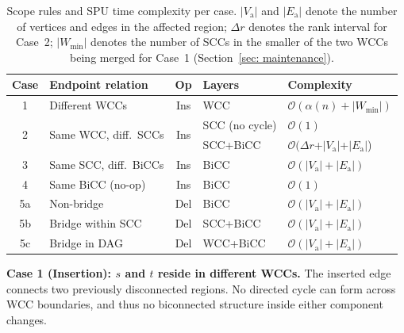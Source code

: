 \begin{table}[t]
    \centering
    \setlength{\tabcolsep}{3pt}
    \caption{Scope rules and SPU time complexity per case.
    $|V_{\mathrm{a}}|$ and $|E_{\mathrm{a}}|$ denote the number of vertices and edges in the affected region;
    $\Delta r$ denotes the rank interval for Case~2;
    $|W_{\min}|$ denotes the number of SCCs in the smaller of the two WCCs being merged for Case~1 (Section~\ref{sec: maintenance}).}
    \begin{tabular}{c l c l l}
    \toprule
    \textbf{Case} & \textbf{Endpoint relation} & \textbf{Op} & \textbf{Layers} & \textbf{Complexity} \\
    \midrule
    1  & Different WCCs                         & Ins & WCC             & $\mathcal{O}(\alpha(n) + |W_{\min}|)$ \\
    \multirow{2}{*}{2}
       & \multirow{2}{*}{Same WCC, diff.\ SCCs} & \multirow{2}{*}{Ins}
                                                & SCC (no cycle)  & $\mathcal{O}(1)$ \\
       &                                        &     & SCC+BiCC        & $\mathcal{O}(\Delta r$+$|V_{\mathrm{a}}|$+$|E_{\mathrm{a}}|$) \\
    3  & Same SCC, diff.\ BiCCs                 & Ins & BiCC            & $\mathcal{O}(|V_{\mathrm{a}}|+|E_{\mathrm{a}}|)$ \\
    4  & Same BiCC (no-op)                      & Ins & BiCC             & $\mathcal{O}(1)$ \\
    \midrule
    5a & Non-bridge                             & Del & BiCC            & $\mathcal{O}(|V_{\mathrm{a}}|+|E_{\mathrm{a}}|)$ \\
    5b & Bridge within SCC                      & Del & SCC+BiCC        & $\mathcal{O}(|V_{\mathrm{a}}|+|E_{\mathrm{a}}|)$ \\
    5c & Bridge in DAG                          & Del & WCC+BiCC        & $\mathcal{O}(|V_{\mathrm{a}}|+|E_{\mathrm{a}}|)$ \\
    \bottomrule 
    \end{tabular}
    \label{tab:updates}
\end{table}


\textbf{Case 1 (Insertion): $s$ and $t$ reside in different WCCs.}
The inserted edge connects two previously disconnected regions.
No directed cycle can form across WCC boundaries, and thus no biconnected structure inside either component changes.

